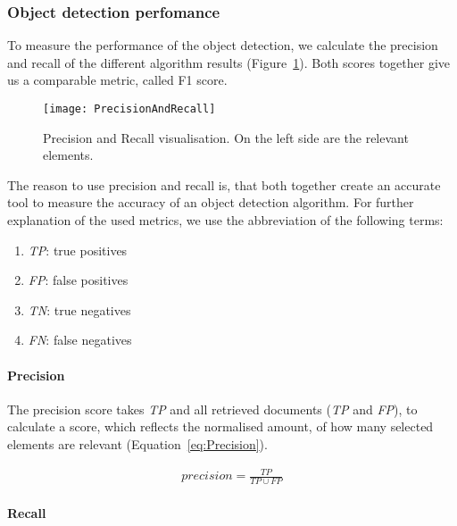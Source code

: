 \subsubsection{Object detection perfomance}
\label{sub:ObjectDetectionPerfomance}

To measure the performance of the object detection, we calculate the precision and recall of the different algorithm results (Figure~\ref{fig:PrecisionAndRecall}). Both scores together give us a comparable metric, called F1 score.

\begin{figure}[H]
	\centering
	\texttt{[image: PrecisionAndRecall]}
	\caption{Precision and Recall visualisation. On the left side are the relevant elements.}
	\label{fig:PrecisionAndRecall}
\end{figure}

The reason to use precision and recall is, that both together create an accurate tool to measure the accuracy of an object detection algorithm. For further explanation of the used metrics, we use the abbreviation of the following terms:

\begin{enumerate}[label=]
    \item \textit{TP}: true positives
    \item \textit{FP}: false positives
    \item \textit{TN}: true negatives
    \item \textit{FN}: false negatives
\end{enumerate}

\paragraph{Precision}
\label{sub:Precision}

The precision score takes \textit{TP} and all retrieved documents (\textit{TP} and \textit{FP}), to calculate a score, which reflects the normalised amount, of how many selected elements are relevant (Equation~\ref{eq:Precision}).

\begin{equation} \label{eq:Precision}
\begin{gathered}
precision = \frac{TP}{TP \cup  FP}
\end{gathered}
\end{equation}

\paragraph{Recall}
\label{sub:recall}

